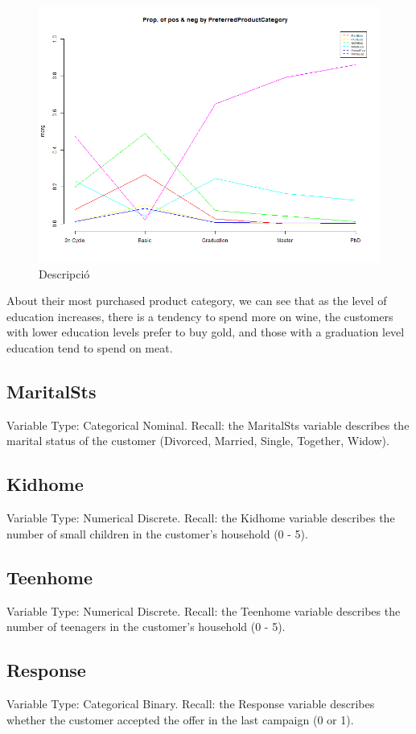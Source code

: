 \begin{figure}[H]
    \centering
    \includegraphics[width=0.8\linewidth]{Imatges/prop_cond_class_PreferredProductCategory_4_legend.png}
    \caption{Descripció}
    \label{fig:scree_plot}
\end{figure}
\newline
About their most purchased product category, we can see that as the level of education increases, there is a tendency to spend more on wine, the customers with lower education levels prefer to buy gold, and those with a graduation level education tend to spend on meat.
\subsection{MaritalSts}
Variable Type: Categorical Nominal.\newline
Recall: the MaritalSts variable describes the marital status of the customer (Divorced, Married, Single, Together, Widow).
\subsection{Kidhome}
Variable Type: Numerical Discrete.\newline
Recall: the Kidhome variable describes the number of small children in the customer's household (0 - 5).
\subsection{Teenhome}
Variable Type: Numerical Discrete.\newline
Recall: the Teenhome variable describes the number of teenagers in the customer's household (0 - 5).
\subsection{Response}
Variable Type: Categorical Binary.\newline
Recall: the Response variable describes whether the customer accepted the offer in the last campaign (0 or 1).
